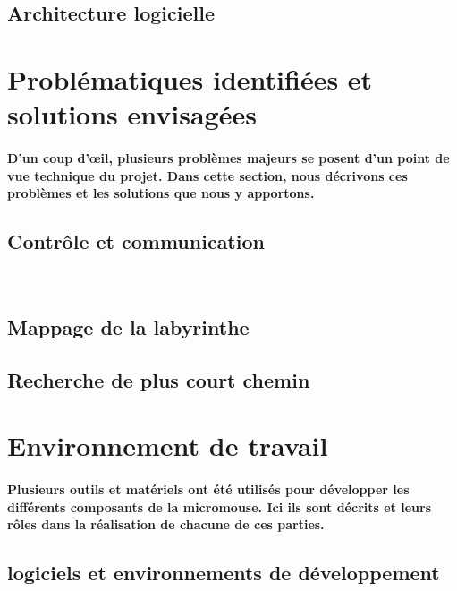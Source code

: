 \subsection{Architecture logicielle} \label{subsec:vueLogicielle}

\section{Problématiques identifiées et solutions envisagées} \label{sec:problemesSolutions}

\paragraph{
D'un coup d'œil, plusieurs problèmes majeurs se posent d'un point de vue technique du projet.
Dans cette section, nous décrivons ces problèmes et les solutions que nous y apportons.
}

\subsection{Contrôle et communication} \label{subsec:ctrlComm}

\subsection{Mappage de la labyrinthe} \label{subsec:mapMaze}

\subsection{Recherche de plus court chemin} \label{subsec:rechChem}

\section{Environnement de travail} \label{sec:environnement}

\paragraph{
Plusieurs outils et matériels ont été utilisés pour développer les différents composants
de la micromouse. Ici ils sont décrits et leurs rôles dans la réalisation de chacune de ces parties.
}

\subsection{logiciels et environnements de développement} \label{subsec:softDev}
   
